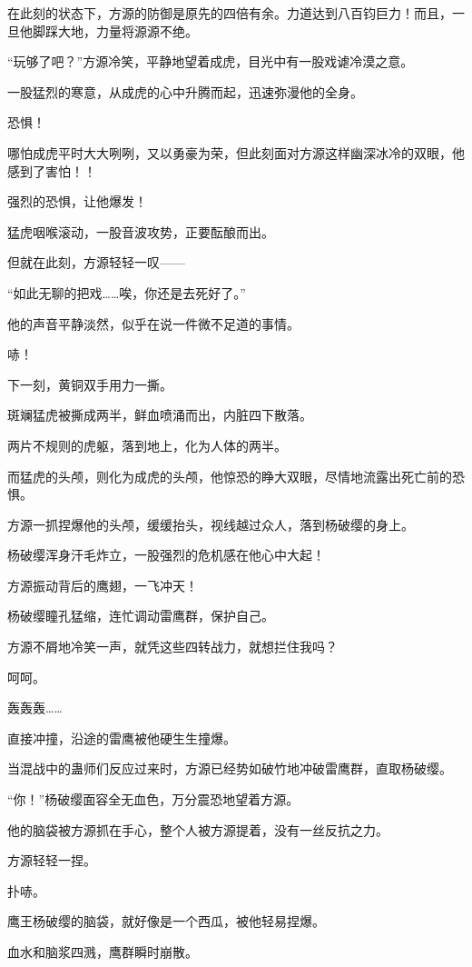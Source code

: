 \begin{this_body}
在此刻的状态下，方源的防御是原先的四倍有余。力道达到八百钧巨力！而且，一旦他脚踩大地，力量将源源不绝。

“玩够了吧？”方源冷笑，平静地望着成虎，目光中有一股戏谑冷漠之意。

一股猛烈的寒意，从成虎的心中升腾而起，迅速弥漫他的全身。

恐惧！

哪怕成虎平时大大咧咧，又以勇豪为荣，但此刻面对方源这样幽深冰冷的双眼，他感到了害怕！！

强烈的恐惧，让他爆发！

猛虎咽喉滚动，一股音波攻势，正要酝酿而出。

但就在此刻，方源轻轻一叹——

“如此无聊的把戏……唉，你还是去死好了。”

他的声音平静淡然，似乎在说一件微不足道的事情。

哧！

下一刻，黄铜双手用力一撕。

斑斓猛虎被撕成两半，鲜血喷涌而出，内脏四下散落。

两片不规则的虎躯，落到地上，化为人体的两半。

而猛虎的头颅，则化为成虎的头颅，他惊恐的睁大双眼，尽情地流露出死亡前的恐惧。

方源一抓捏爆他的头颅，缓缓抬头，视线越过众人，落到杨破缨的身上。

杨破缨浑身汗毛炸立，一股强烈的危机感在他心中大起！

方源振动背后的鹰翅，一飞冲天！

杨破缨瞳孔猛缩，连忙调动雷鹰群，保护自己。

方源不屑地冷笑一声，就凭这些四转战力，就想拦住我吗？

呵呵。

轰轰轰……

直接冲撞，沿途的雷鹰被他硬生生撞爆。

当混战中的蛊师们反应过来时，方源已经势如破竹地冲破雷鹰群，直取杨破缨。

“你！”杨破缨面容全无血色，万分震恐地望着方源。

他的脑袋被方源抓在手心，整个人被方源提着，没有一丝反抗之力。

方源轻轻一捏。

扑哧。

鹰王杨破缨的脑袋，就好像是一个西瓜，被他轻易捏爆。

血水和脑浆四溅，鹰群瞬时崩散。


\end{this_body}
